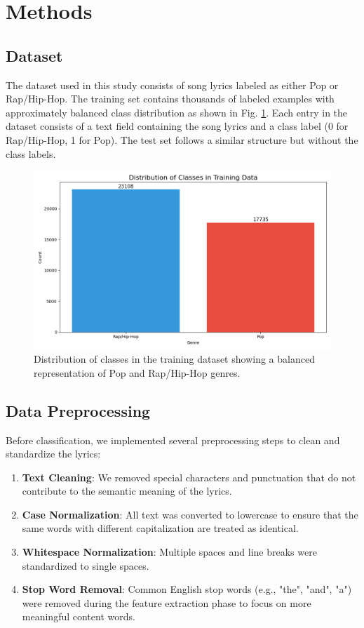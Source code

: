 \documentclass[conference]{IEEEtran}
\begin{document}
\section{Methods}
\subsection{Dataset}
The dataset used in this study consists of song lyrics labeled as either Pop or Rap/Hip-Hop. The training set contains thousands of labeled examples with approximately balanced class distribution as shown in Fig. \ref{fig:class_dist}. Each entry in the dataset consists of a text field containing the song lyrics and a class label (0 for Rap/Hip-Hop, 1 for Pop). The test set follows a similar structure but without the class labels.

\begin{figure}[htbp]
\centerline{\includegraphics[width=0.9\columnwidth]{plots/svm_class_distribution.png}}
\caption{Distribution of classes in the training dataset showing a balanced representation of Pop and Rap/Hip-Hop genres.}
\label{fig:class_dist}
\end{figure}

\subsection{Data Preprocessing}
Before classification, we implemented several preprocessing steps to clean and standardize the lyrics:
\begin{enumerate}
\item \textbf{Text Cleaning}: We removed special characters and punctuation that do not contribute to the semantic meaning of the lyrics.
\item \textbf{Case Normalization}: All text was converted to lowercase to ensure that the same words with different capitalization are treated as identical.
\item \textbf{Whitespace Normalization}: Multiple spaces and line breaks were standardized to single spaces.
\item \textbf{Stop Word Removal}: Common English stop words (e.g., "the", "and", "a") were removed during the feature extraction phase to focus on more meaningful content words.
\end{enumerate}
\end{document}
